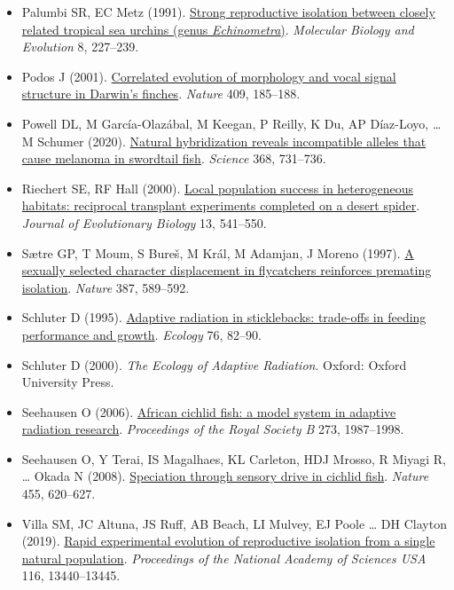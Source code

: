 \documentclass[
]{book}
\begin{document}
\begin{itemize}
\item
  Palumbi SR, EC Metz (1991). \href{https://academic.oup.com/mbe/article/8/2/227/1134109}{Strong reproductive isolation between closely related tropical sea urchins (genus \emph{Echinometra})}. \emph{Molecular Biology and Evolution} 8, 227--239.
\item
  Podos J (2001). \href{https://www.nature.com/articles/35051570}{Correlated evolution of morphology and vocal signal structure in Darwin's finches}. \emph{Nature} 409, 185--188.
\item
  Powell DL, M García-Olazábal, M Keegan, P Reilly, K Du, AP Díaz-Loyo, \ldots{} M Schumer (2020). \href{https://www.science.org/lookup/doi/10.1126/science.aba5216}{Natural hybridization reveals incompatible alleles that cause melanoma in swordtail fish}. \emph{Science} 368, 731--736.
\item
  Riechert SE, RF Hall (2000). \href{https://onlinelibrary.wiley.com/doi/abs/10.1046/j.1420-9101.2000.00176.x}{Local population success in heterogeneous habitats: reciprocal transplant experiments completed on a desert spider}. \emph{Journal of Evolutionary Biology} 13, 541--550.
\item
  Sætre GP, T Moum, S Bureš, M Král, M Adamjan, J Moreno (1997). \href{https://www.nature.com/articles/42451}{A sexually selected character displacement in flycatchers reinforces premating isolation}. \emph{Nature} 387, 589--592.
\item
  Schluter D (1995). \href{https://www.jstor.org/stable/1940633?seq=1\#metadata_info_tab_contents}{Adaptive radiation in sticklebacks: trade-offs in feeding performance and growth}. \emph{Ecology} 76, 82--90.
\item
  Schluter D (2000). \emph{The Ecology of Adaptive Radiation}. Oxford: Oxford University Press.
\item
  Seehausen O (2006). \href{https://royalsocietypublishing.org/doi/10.1098/rspb.2006.3539}{African cichlid fish: a model system in adaptive radiation research}. \emph{Proceedings of the Royal Society B} 273, 1987--1998.
\item
  Seehausen O, Y Terai, IS Magalhaes, KL Carleton, HDJ Mrosso, R Miyagi R, \ldots{} Okada N (2008). \href{https://www.nature.com/articles/nature07285}{Speciation through sensory drive in cichlid fish}. \emph{Nature} 455, 620--627.
\item
  Villa SM, JC Altuna, JS Ruff, AB Beach, LI Mulvey, EJ Poole \ldots{} DH Clayton (2019). \href{https://www.pnas.org/content/116/27/13440}{Rapid experimental evolution of reproductive isolation from a single natural population}. \emph{Proceedings of the National Academy of Sciences USA} 116, 13440--13445.
\end{itemize}
\end{document}
